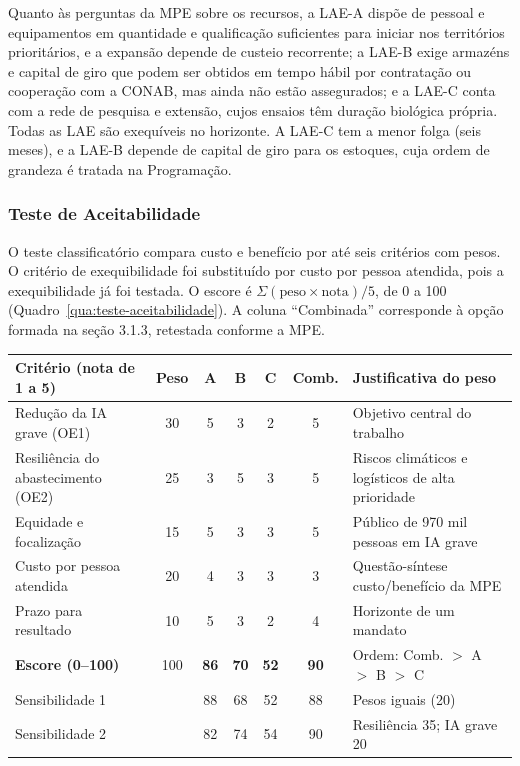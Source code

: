 \documentclass[
	12pt,				%
	openright,			%
	oneside,			%
	a4paper,			%
	chapter=TITLE,		%
	section=TITLE,		%
	english,			%
	french,				%
	spanish,			%
	brazil,				%
 ]{abntex2}
\begin{document}
Quanto às perguntas da MPE sobre os recursos, a LAE-A dispõe de pessoal e
equipamentos em quantidade e qualificação suficientes para iniciar nos
territórios prioritários, e a expansão depende de custeio recorrente; a LAE-B
exige armazéns e capital de giro que podem ser obtidos em tempo hábil por
contratação ou cooperação com a CONAB, mas ainda não estão assegurados; e a LAE-C
conta com a rede de pesquisa e extensão, cujos ensaios têm duração biológica
própria. Todas as LAE são exequíveis no horizonte. A LAE-C tem a menor folga
(seis meses), e a LAE-B depende de capital de giro para os estoques, cuja ordem
de grandeza é tratada na Programação.

\subsubsection{Teste de Aceitabilidade}
O teste classificatório compara custo e benefício por até seis critérios com
pesos. O critério de exequibilidade foi
substituído por custo por pessoa atendida, pois a exequibilidade já foi testada.
O escore é $\Sigma(\mathrm{peso}\times\mathrm{nota})/5$, de 0 a 100
(Quadro~\ref{qua:teste-aceitabilidade}). A coluna ``Combinada'' corresponde à
opção formada na seção 3.1.3, retestada conforme a MPE.

\begin{quadro}[!htbp]
\centering
\caption{Teste de aceitabilidade e análise de sensibilidade}
\label{qua:teste-aceitabilidade}
\footnotesize
\renewcommand{\arraystretch}{1.05}
\setlength{\tabcolsep}{3pt}
\begin{tabularx}{\textwidth}{|>{\raggedright\arraybackslash}p{3.6cm}|c|c|c|c|c|>{\raggedright\arraybackslash}X|}
\hline
\textbf{Critério (nota de 1 a 5)} & \textbf{Peso} & \textbf{A} & \textbf{B} & \textbf{C} & \textbf{Comb.} & \textbf{Justificativa do peso} \\
\hline
Redução da IA grave (OE1) & 30 & 5 & 3 & 2 & 5 & Objetivo central do trabalho \\
\hline
Resiliência do abastecimento (OE2) & 25 & 3 & 5 & 3 & 5 & Riscos climáticos e logísticos de alta prioridade \\
\hline
Equidade e focalização & 15 & 5 & 3 & 3 & 5 & Público de 970 mil pessoas em IA grave \\
\hline
Custo por pessoa atendida & 20 & 4 & 3 & 3 & 3 & Questão-síntese custo/benefício da MPE \\
\hline
Prazo para resultado & 10 & 5 & 3 & 2 & 4 & Horizonte de um mandato \\
\hline
\textbf{Escore (0--100)} & 100 & \textbf{86} & \textbf{70} & \textbf{52} & \textbf{90} & Ordem: Comb. $>$ A $>$ B $>$ C \\
\hline
Sensibilidade 1 & & 88 & 68 & 52 & 88 & Pesos iguais (20) \\
\hline
Sensibilidade 2 & & 82 & 74 & 54 & 90 & Resiliência 35; IA grave 20 \\
\hline
\end{tabularx}
\end{quadro}
\end{document}
